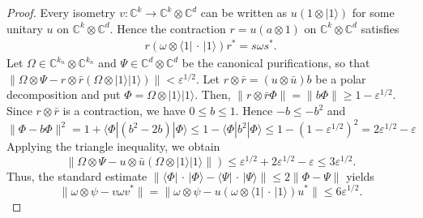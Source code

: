 \documentclass[a4paper, 10pt, onecolumn, accepted=2025-07-22]{quantumarticle}
\theoremstyle{definition}
\newcommand{\ket}[1]{|#1\rangle}
\newcommand{\bra}[1]{\langle#1|}
\newcommand{\norm}[1]{\lVert #1\rVert}
\newcommand{\ox}{\otimes}
\newcommand{\eps}{\varepsilon}
\def\CC{{\mathbb C}}
\newcommand*{\1}{\text{\usefont{U}{bbold}{m}{n}1}}
\newcommand{\placeholder}[0]{{\,\cdot\,}}
\begin{document}
\begin{proof}
    Every isometry $v:\CC^k\to \CC^k\ox \CC^d$ can be written as $u(1\ox \ket 1)$ for some unitary $u$ on $\CC^k\ox \CC^d$.
    Hence the contraction $r= u(a\ox 1)$ on $\CC^k\ox \CC^d$ satisfies
    \begin{align}
        r(\omega \ox \bra1\placeholder\ket1)r^* = s\omega s^*. 
    \end{align}
    Let $\Omega\in\CC^{k_n}\otimes\CC^{k_n}$ and $\Psi\in\CC^d\ox\CC^d$ be the canonical purifications, so that $\norm{\Omega \ox\Psi - r\ox\bar r(\Omega\ox \ket1\ket1)}< \eps^{1/2}$.
    Let $r\ox\bar r= (u\ox \bar u)b$ be a polar decomposition and put $\Phi=\Omega\ox\ket1\ket1$.
    Then, $\norm{r\ox\bar r \Phi}=\norm{b\Phi} \ge 1-\eps^{1/2}$.
    Since $r\ox\bar r$ is a contraction, we have $0\leq b\leq 1$. Hence $-b \le -b^2$ and
    \begin{equation*}
        \norm{\Phi-b\Phi}^2 = 1 + \bra{\Phi}(b^2-2b)\ket{\Phi}  \le 1- \bra{\Phi}b^2\ket{\Phi} \le 1- (1-\eps^{1/2})^2 = 2\eps^{1/2}-\eps
    \end{equation*}
    Applying the triangle inequality, we obtain 
    \begin{equation*}
        \norm{\Omega\ox\Psi-u\ox\bar u(\Omega\ox\ket1\ket1} )
        \le \eps^{1/2} + 2\eps^{1/2} -\eps \le 3\eps^{1/2}.
    \end{equation*}
    Thus, the standard estimate $\norm{\bra\Phi\placeholder\ket\Phi-\bra\Psi\placeholder\ket\Psi} \le 2 \norm{\Phi-\Psi}$ yields
    \begin{equation*}
     \norm{\omega\ox\psi - v\omega v^*} = \norm{\omega\ox\psi - u(\omega\ox\bra1\placeholder\ket1)u^*} \le 6 \eps^{1/2}.
    \end{equation*}
\end{proof}
\end{document}
